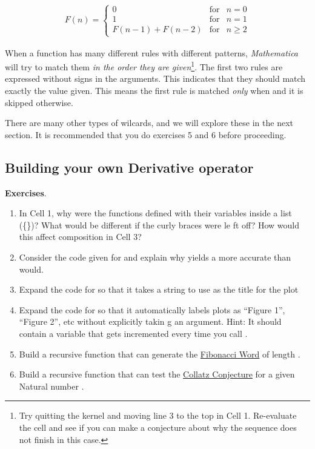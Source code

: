 \begin{align}
	   F(n) = \left\{ \begin{array}{rcl}
			 0 & \mbox{for} & n = 0 \\
			 1 & \mbox{for} & n = 1 \\
			 F(n-1) + F(n-2) & \mbox{for} & n \geq 2
	   \end{array}\right.
\end{align}

When a function has many different rules with different patterns, \emph{Mathematica} will try to match them \emph{in the order they are given}\footnote{Try quitting the kernel and moving line 3 to the top in Cell 1. Re-evaluate the cell and see if you can make a conjecture about why the sequence does not finish in this case.}. The first two rules are expressed without \expr{\_} signs in the arguments. This indicates that they should match exactly the value given. This means the first rule is matched \emph{only} when  and it is skipped otherwise.

There are many other types of wilcards, and we will explore these in the next section. It is recommended that you do exercises 5 and 6 before proceeding.

\subsection{Building your own Derivative operator}


\textbf{Exercises}.
\begin{enumerate}
 	   \item In Cell 1, why were the functions defined with their variables inside a list (\{\})? What would be different if the curly braces were le ft off? How would this affect composition in Cell 3?
 	   \item Consider the code given for  and explain why  yields a more accurate  than  would. 
	   \item Expand the code for  so that it takes a string to use as the title for the plot
 	   \item Expand the code for  so that it automatically labels plots as ``Figure 1'', ``Figure 2'', etc without explicitly takin g an argument. Hint: It should contain a variable that gets incremented every time you call . 
	   \item Build a recursive function that can generate the \href{http://en.wikipedia.org/wiki/Fibonacci_word}{Fibonacci Word} of length . 
	   \item Build a recursive function that can test the \href{http://en.wikipedia.org/wiki/Collatz_conjecture}{Collatz Conjecture} for a given Natural number . 
\end{enumerate}
